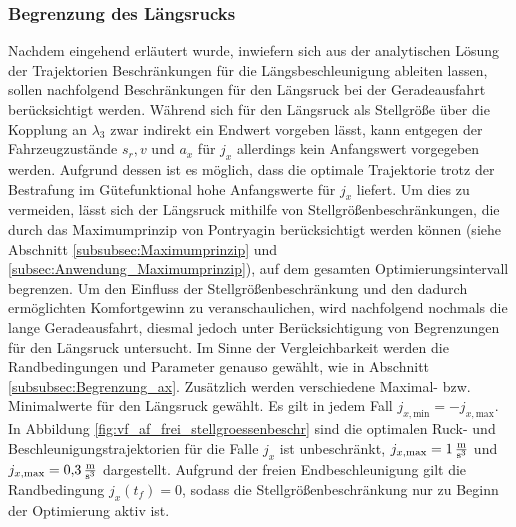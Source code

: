 \subsubsection{Begrenzung des Längsrucks}
Nachdem eingehend erläutert wurde, inwiefern sich aus der analytischen Lösung der Trajektorien Beschränkungen für die Längsbeschleunigung ableiten lassen, sollen nachfolgend Beschränkungen für den Längsruck bei der Geradeausfahrt berücksichtigt werden. Während sich für den Längsruck als Stellgröße über die Kopplung an $\lambda_3$ zwar indirekt ein Endwert vorgeben lässt, kann entgegen der Fahrzeugzustände $s_r, v$ und $a_x$ für $j_x$ allerdings kein Anfangswert vorgegeben werden. Aufgrund dessen ist es möglich, dass die optimale Trajektorie trotz der Bestrafung im Gütefunktional hohe Anfangswerte für $j_x$ liefert. Um dies zu vermeiden, lässt sich der Längsruck mithilfe von Stellgrößenbeschränkungen, die durch das Maximumprinzip von Pontryagin berücksichtigt werden können (siehe Abschnitt \ref{subsubsec:Maximumprinzip} und \ref{subsec:Anwendung_Maximumprinzip}), auf dem gesamten Optimierungsintervall begrenzen. Um den Einfluss der Stellgrößenbeschränkung und den dadurch ermöglichten Komfortgewinn zu veranschaulichen, wird nachfolgend nochmals die lange Geradeausfahrt, diesmal jedoch unter Berücksichtigung von Begrenzungen für den Längsruck untersucht. Im Sinne der Vergleichbarkeit werden die Randbedingungen und Parameter genauso gewählt, wie in Abschnitt \ref{subsubsec:Begrenzung_ax}. Zusätzlich werden verschiedene Maximal- bzw. Minimalwerte für den Längsruck gewählt. Es gilt in jedem Fall $j_{x,\textrm{min}} = -j_{x,\textrm{max}}$. In Abbildung \ref{fig:vf_af_frei_stellgroessenbeschr} sind die optimalen Ruck- und Beschleunigungstrajektorien für die Falle $j_x$ ist unbeschränkt, $j_{x,\textrm{max}} = 1\,\mathrm{\frac{\mathrm{m}}{\mathrm{s^3}}}$ und $j_{x,\textrm{max}} = 0{,}3\,\mathrm{\frac{\mathrm{m}}{\mathrm{s^3}}}$ dargestellt. Aufgrund der freien Endbeschleunigung gilt die Randbedingung $j_x(t_f) = 0$, sodass die Stellgrößenbeschränkung nur zu Beginn der Optimierung aktiv ist. 
